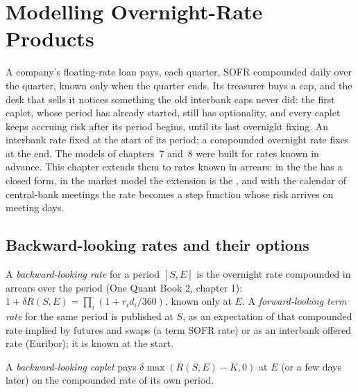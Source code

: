 \chapter{Modelling Overnight-Rate Products}\label{ch:rc:modelling-overnight-rate-products}

A company's floating-rate loan pays, each quarter, SOFR compounded daily over
the quarter, known only when the quarter ends. Its treasurer buys a cap, and
the desk that sells it notices something the old interbank caps never did: the
first caplet, whose period has already started, still has optionality, and
every caplet keeps accruing risk after its period begins, until its last
overnight fixing. An interbank rate fixed at the start of its period; a
compounded overnight rate fixes at the end. The models of chapters~7 and~8 were
built for rates known in advance. This chapter extends them to rates known in
arrears: in the  the  has a closed
form, in the market model the extension is the ,
and with the calendar of central-bank meetings the rate becomes a step function
whose risk arrives on meeting days.

\section{Backward-looking rates and their options}

\begin{definition}\label{def:rc:modelling-overnight-rate-products:rates}
A \emph{backward-looking rate} for a period $[S,E]$ is
the overnight rate compounded in arrears over the period (One Quant Book 2,
chapter 1): $1+\delta R(S,E) = \prod_i(1+r_id_i/360)$, known only at $E$. A
\emph{forward-looking term rate} for the same
period is published at $S$, as an expectation of that compounded rate implied by
futures and swaps (a term SOFR rate) or as an interbank offered rate (Euribor);
it is known at the start.
\end{definition}

\begin{definition}\label{def:rc:modelling-overnight-rate-products:caplet}
A \emph{backward-looking caplet} pays
$\delta\max(R(S,E)-K,0)$ at $E$ (or a few days later) on the compounded rate of
its own period.
\end{definition}

